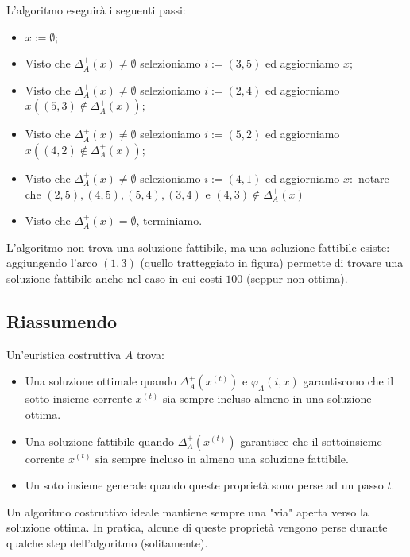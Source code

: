 \documentclass{article}
\begin{document}
    L'algoritmo eseguirà i seguenti passi:
    \begin{itemize}
        \item $x:=\emptyset;$
        \item Visto che $\Delta_A^+(x)\neq\emptyset$ selezioniamo $i:=(3,5)$ ed aggiorniamo $x;$
        \item Visto che $\Delta_A^+(x)\neq\emptyset$ selezioniamo $i:=(2,4)$ ed aggiorniamo $x((5,3)\notin\Delta_A^+(x));$
        \item Visto che $\Delta_A^+(x)\neq\emptyset$ selezioniamo $i:=(5,2)$ ed aggiorniamo $x((4,2)\notin\Delta_A^+(x));$
        \item Visto che $\Delta_A^+(x)\neq\emptyset$ selezioniamo $i:=(4,1)$ ed aggiorniamo $x:$
              notare che $(2,5),(4,5),(5,4),(3,4)$ e $(4,3)\notin \Delta_A^+(x)$
        \item Visto che $\Delta_A^+(x)=\emptyset$, terminiamo.
    \end{itemize}
    L'algoritmo non trova una soluzione fattibile, ma una soluzione fattibile esiste: aggiungendo
    l'arco $(1,3)$ (quello tratteggiato in figura) permette di trovare una soluzione fattibile anche
    nel caso in cui costi $100$ (seppur non ottima).
    \subsection{Riassumendo}
    Un'euristica costruttiva $A$ trova:
    \begin{itemize}
        \item Una soluzione ottimale quando $\Delta_A^+(x^{(t)})$ e $\varphi_A(i,x)$ garantiscono
              che il sotto insieme corrente $x^{(t)}$ sia sempre incluso almeno in una soluzione ottima.
        \item Una soluzione fattibile quando $\Delta_A^+(x^{(t)})$ garantisce che il sottoinsieme
              corrente $x^{(t)}$ sia sempre incluso in almeno una soluzione fattibile.
        \item Un soto insieme generale quando queste proprietà sono perse ad un passo $t$.
    \end{itemize}
    Un algoritmo costruttivo ideale mantiene sempre una "via" aperta verso la soluzione
    ottima. In pratica, alcune di queste proprietà vengono perse durante qualche
    step dell'algoritmo (solitamente).
\end{document}
